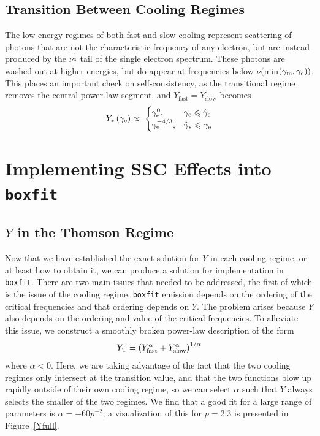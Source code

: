 \documentclass[fleqn,usenatbib]{mnras}
\begin{document}
\subsection{Transition Between Cooling Regimes}
The low-energy regimes of both fast and slow cooling represent scattering of photons that are not the characteristic frequency of any electron, but are instead produced by the $\nu^\frac{1}{3}$ tail of the single electron spectrum. These photons are washed out at higher energies, but do appear at frequencies below $\nu($min$(\gamma_{\rm m},\gamma_{\rm c}))$. This places an important check on self-consistency, as the transitional regime removes the central power-law segment, and $Y_{\text{fast}}=Y_{\text{slow}}$ becomes
\begin{equation}
Y_{*}\left(\gamma_{\rm e}\right)  \propto\ \begin{cases} 
      \gamma_{\rm e}^0, & \gamma_{\rm e} \leq \hat{\gamma}_{\rm c} \\
      \gamma_{\rm e}^{-4/3}, & \hat{\gamma}_*  \leq \gamma_{\rm e}
   \end{cases}
\end{equation}


\section{Implementing SSC Effects into \lowercase{{\texttt{boxfit}}}} 
\label{KNimp}

\subsection{$Y$ in the Thomson Regime}

\indent Now that we have established the exact solution for $Y$ in each cooling regime, or at least how to obtain it, we can produce a solution for implementation in \texttt{boxfit}. There are two main issues that needed to be addressed, the first of which is the issue of the cooling regime. \texttt{boxfit} emission depends on the ordering of the critical frequencies and that ordering depends on $Y$. The problem arises because $Y$ also depends on the ordering and value of the critical frequencies. To alleviate this issue, we construct a smoothly broken power-law description of the form 
\begin{equation}
Y_{\rm T} = \left(Y_{\rm fast}^{\alpha}+Y_{\rm slow}^{\alpha}\right)^{1/\alpha}
\end{equation}
where $\alpha<0$.  Here, we are taking advantage of the fact that the two cooling regimes only intersect at the transition value, and that the two functions blow up rapidly outside of their own cooling regime, so we can select $\alpha$ such that $Y$ always selects the smaller of the two regimes. We find that a good fit for a large range of parameters is $\alpha=-60p^{-2}$; a visualization of this for $p=2.3$ is presented in Figure~\ref{Yfull}.  
\end{document}
